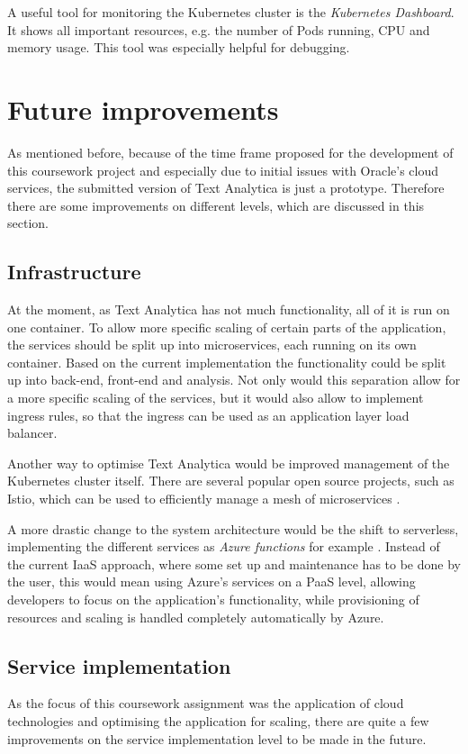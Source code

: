 \documentclass[conference]{IEEEtran}
\begin{document}
A useful tool for monitoring the Kubernetes cluster is the \textit{Kubernetes Dashboard}. It shows all important resources, e.g. the number of Pods running, CPU and memory usage. This tool was especially helpful for debugging.

\section{Future improvements}
\label{sec:future-improvements}
As mentioned before, because of the time frame proposed for the development of this coursework project and especially due to initial issues with Oracle’s cloud services, the submitted version of Text Analytica is just a prototype. Therefore there are some improvements on different levels, which are discussed in this section.

\subsection{Infrastructure}
At the moment, as Text Analytica has not much functionality, all of it is run on one container. To allow more specific scaling of certain parts of the application, the services should be split up into microservices, each running on its own container. Based on the current implementation the functionality could be split up into back-end, front-end and analysis. Not only would this separation allow for a more specific scaling of the services, but it would also allow to implement ingress rules, so that the ingress can be used as an application layer load balancer.

Another way to optimise Text Analytica would be improved management of the Kubernetes cluster itself. There are several popular open source projects, such as Istio, which can be used to efficiently manage a mesh of microservices \cite{Istio}.

A more drastic change to the system architecture would be the shift to serverless, implementing the different services as \textit{Azure functions} for example \cite{AzureFunctions}. Instead of the current IaaS approach, where some set up and maintenance has to be done by the user, this would mean using Azure’s services on a PaaS level, allowing developers to focus on the application’s functionality, while provisioning of resources and scaling is handled completely automatically by Azure.

\subsection{Service implementation}
As the focus of this coursework assignment was the application of cloud technologies and optimising the application for scaling, there are quite a few improvements on the service implementation level to be made in the future.
\end{document}
